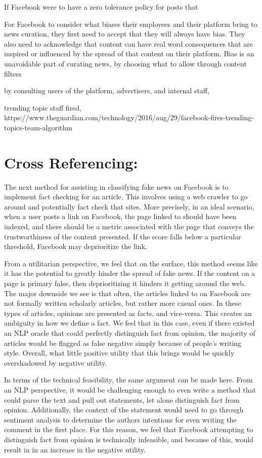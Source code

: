 \documentclass[12pt]{article}
\begin{document}
If Facebook were to have a zero tolerance policy for posts that 

For Facebook to consider what biases their employees and their platform bring to news curation, they first need to accept that they will always have bias. They also need to acknowledge that content can have real word consequences that are inspired or influenced by the spread of that content on their platform. Bias is an unavoidable part of curating news, by choosing what to allow through content filters

 by consulting users of the platform, advertisers, and internal staff, 

trending topic staff fired, https://www.theguardian.com/technology/2016/aug/29/facebook-fires-trending-topics-team-algorithm


\section{Cross Referencing:}
The next method for assisting in classifying fake news on Facebook is to implement fact checking for an article. This involves using a web crawler to go around and potentially fact check that sites. More precisely, in an ideal scenario, when a user posts a link on Facebook, the page linked to should have been indexed, and there should be a metric associated with the page that conveys the trustworthiness of the content presented. If the score falls below a particular threshold, Facebook may deprioritize the link.  

From a utilitarian perspective, we feel that on the surface, this method seems like it has the potential to greatly hinder the spread of fake news. If the content on a page is primary false, then deprioritizing it hinders it getting around the web. The major downside we see is that often, the articles linked to on Facebook are not formally written scholarly articles, but rather more casual ones. In these types of articles, opinions are presented as facts, and vice-versa. This creates an ambiguity in how we define a fact. We feel that in this case, even if there existed an NLP oracle that could perfectly distinguish fact from opinion, the majority of articles would be flagged as false negative simply because of people's writing style. Overall, what little positive utility that this brings would be quickly overshadowed by negative utility.

In terms of the technical feasibility, the same argument can be made here. From an NLP perspective, it would be challenging enough to even write a method that could parse the text and pull out statements, let alone distinguish fact from opinion. Additionally, the context of the statement would need to go through sentiment analysis to determine the authors intentions for even writing the comment in the first place. For this reason, we feel that Facebook attempting to distinguish fact from opinion is technically infeasible, and because of this, would result in in an increase in the negative utility.
\end{document}
